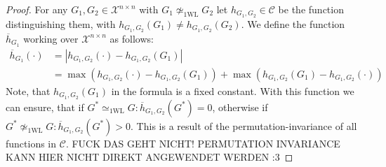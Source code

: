 \documentclass[11pt, dvipsnames, DIV=12]{scrreprt}
\theoremstyle{definition}
\newcommand{\cC}{\mathcal{C}}
\newcommand{\wliso}{\simeq_{\text{1WL}}}
\newcommand{\xnn}{\mathcal{X}^{n \times n}}
\begin{document}
\begin{proof}
    For any $G_1, G_2 \in \xnn$ with $G_1 \not\wliso G_2$ let $h_{G_1, G_2} \in \cC$ be the function distinguishing them, with $h_{G_1, G_2}(G_1) \neq h_{G_1, G_2}(G_2)$. We define the function $\overline{h}_{G_1}$ working over $\xnn$ as follows:
    \begin{align*}
        \overline{h}_{G_1}(\cdot) &= |h_{G_1, G_2}(\cdot) - h_{G_1, G_2}(G_1)| \nonumber\\
        &= \max(h_{G_1, G_2}(\cdot) - h_{G_1, G_2}(G_1)) + \max(h_{G_1, G_2}(G_1) - h_{G_1, G_2}(\cdot))
    \end{align*}
    Note, that $h_{G_1, G_2}(G_1)$ in the formula is a fixed constant. With this function we can ensure, that if $G^* \wliso G: \overline{h}_{G_1, G_2}(G^*) = 0$, otherwise if $G^* \not\wliso G: \overline{h}_{G_1, G_2}(G^*) > 0$. This is a result of the permutation-invariance of all functions in $\cC$. FUCK DAS GEHT NICHT! PERMUTATION INVARIANCE KANN HIER NICHT DIREKT ANGEWENDET WERDEN :3

\end{proof}
\end{document}
